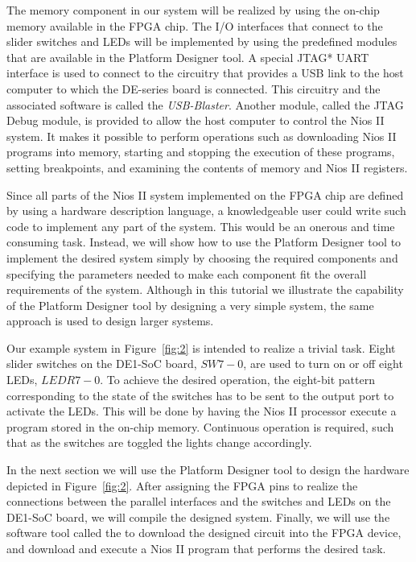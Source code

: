 \documentclass[11pt, twoside, pdftex]{article}
\begin{document}
The memory component in our system will be realized by using the on-chip memory
available in the FPGA chip.
The I/O interfaces that connect to the slider switches and LEDs will be implemented by
using the predefined modules that are available in the Platform Designer tool.
A special JTAG* UART interface is used to connect to the circuitry that provides a USB
link to the host computer to which the DE-series board is connected. This circuitry and the
associated software is called the {\it USB-Blaster}. Another module, called the
JTAG Debug module, is provided to allow the host computer to control the Nios II system.
It makes it possible to perform operations such as downloading Nios II programs into memory,
starting and stopping the execution of these programs, setting breakpoints, and examining the 
contents of memory and Nios II registers.

Since all parts of the Nios II system implemented on the FPGA chip are defined by
using a hardware description language, a knowledgeable user could write such code
to implement any part of the system. This would be an onerous and time consuming
task. Instead, we will show how to use the Platform Designer tool to implement the desired system simply by
choosing the required components and specifying the parameters needed to make
each component fit the overall requirements of the system. Although in this tutorial we
illustrate the capability of the Platform Designer tool by designing a very simple
system, the same approach is used to design larger systems.

Our example system in Figure~\ref{fig:2} is intended to realize a trivial task.
Eight slider switches on the DE1-SoC board, $SW7-0$, are used to turn on
or off eight LEDs, $LEDR7-0$. To achieve the desired operation,
the eight-bit pattern corresponding to the state of the switches has to be 
sent to the output port to activate the LEDs. This will be done
by having the Nios II processor execute a program stored in the on-chip memory.
Continuous operation is required, such that as the switches are toggled the lights
change accordingly. 

In the next section we will use the Platform Designer tool to design the hardware depicted in Figure~\ref{fig:2}.
After assigning the FPGA pins to realize the connections between
the parallel interfaces and the switches and LEDs on the DE1-SoC board,
we will compile the designed system.
Finally, we will use the software tool called the {\it \productNameMed{}} to 
download the designed circuit into the FPGA device, and 
download and execute a Nios II program that performs the desired task.
\end{document}
